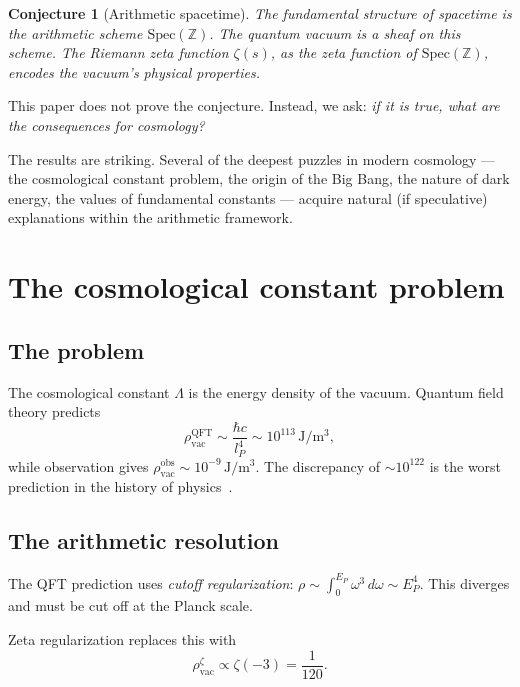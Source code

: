 \documentclass[11pt,a4paper]{article}
\newtheorem{conjecture}[theorem]{Conjecture}
\newcommand{\Spec}{\mathrm{Spec}}
\begin{document}
\begin{conjecture}[Arithmetic spacetime]
\label{conj:arith}
The fundamental structure of spacetime is the arithmetic scheme
$\Spec(\mathbb{Z})$. The quantum vacuum is a sheaf on this scheme.
The Riemann zeta function $\zeta(s)$, as the zeta function of
$\Spec(\mathbb{Z})$, encodes the vacuum's physical properties.
\end{conjecture}

This paper does not prove the conjecture. Instead, we ask:
\emph{if it is true, what are the consequences for cosmology?}

The results are striking. Several of the deepest puzzles in
modern cosmology --- the cosmological constant problem, the
origin of the Big Bang, the nature of dark energy, the values
of fundamental constants --- acquire natural (if speculative)
explanations within the arithmetic framework.

\section{The cosmological constant problem}
\label{sec:cc}

\subsection{The problem}

The cosmological constant $\Lambda$ is the energy density of
the vacuum. Quantum field theory predicts
\begin{equation}
  \rho_{\mathrm{vac}}^{\mathrm{QFT}} \sim \frac{\hbar c}{l_P^4}
  \sim 10^{113}\,\mathrm{J/m^3},
\end{equation}
while observation gives
$\rho_{\mathrm{vac}}^{\mathrm{obs}} \sim 10^{-9}\,\mathrm{J/m^3}$.
The discrepancy of $\sim 10^{122}$ is the worst prediction in
the history of physics~\cite{Weinberg1989}.

\subsection{The arithmetic resolution}

The QFT prediction uses \emph{cutoff regularization}:
$\rho \sim \int_0^{E_P} \omega^3\,d\omega \sim E_P^4$.
This diverges and must be cut off at the Planck scale.

Zeta regularization replaces this with
\begin{equation}
  \rho_{\mathrm{vac}}^{\zeta} \propto \zeta(-3) = \frac{1}{120}.
  \label{eq:cc_zeta}
\end{equation}
\end{document}

